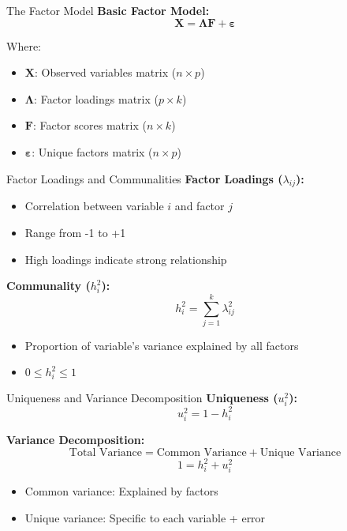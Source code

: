 \documentclass[aspectratio=169]{beamer}
\begin{document}
\begin{frame}{The Factor Model}
  \textbf{Basic Factor Model:}
  $$\mathbf{X} = \boldsymbol{\Lambda}\mathbf{F} + \boldsymbol{\varepsilon}$$
  
  Where:
  \begin{itemize}
    \item $\mathbf{X}$: Observed variables matrix ($n \times p$)
    \item $\boldsymbol{\Lambda}$: Factor loadings matrix ($p \times k$)
    \item $\mathbf{F}$: Factor scores matrix ($n \times k$)
    \item $\boldsymbol{\varepsilon}$: Unique factors matrix ($n \times p$)
  \end{itemize}
\end{frame}

\begin{frame}{Factor Loadings and Communalities}
  \textbf{Factor Loadings ($\lambda_{ij}$):}
  \begin{itemize}
    \item Correlation between variable $i$ and factor $j$
    \item Range from -1 to +1
    \item High loadings indicate strong relationship
  \end{itemize}
  
  \textbf{Communality ($h_i^2$):}
  $$h_i^2 = \sum_{j=1}^{k} \lambda_{ij}^2$$
  \begin{itemize}
    \item Proportion of variable's variance explained by all factors
    \item $0 \leq h_i^2 \leq 1$
  \end{itemize}
\end{frame}

\begin{frame}{Uniqueness and Variance Decomposition}
  \textbf{Uniqueness ($u_i^2$):}
  $$u_i^2 = 1 - h_i^2$$
  
  \textbf{Variance Decomposition:}
  $$\text{Total Variance} = \text{Common Variance} + \text{Unique Variance}$$
  $$1 = h_i^2 + u_i^2$$
  
  \begin{itemize}
    \item Common variance: Explained by factors
    \item Unique variance: Specific to each variable + error
  \end{itemize}
\end{frame}
\end{document}
